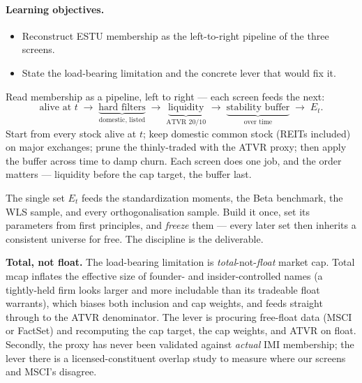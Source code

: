 \documentclass[11pt]{article}
\theoremstyle{definition}
\theoremstyle{plain}
\theoremstyle{remark}
\begin{document}
\paragraph{Learning objectives.}
\begin{itemize}[nosep,leftmargin=1.4em]
  \item Reconstruct ESTU membership as the left-to-right pipeline of the three screens.
  \item State the load-bearing limitation and the concrete lever that would fix it.
\end{itemize}

\begin{intuition}
Read membership as a pipeline, left to right --- each screen feeds the next:
\[
\text{alive at }t \;\to\; \underbrace{\text{hard filters}}_{\text{domestic, listed}} \;\to\; \underbrace{\text{liquidity}}_{\text{ATVR }20/10} \;\to\; \underbrace{\text{stability buffer}}_{\text{over time}} \;\to\; E_t.
\]
Start from every stock alive at $t$; keep domestic common stock (REITs included) on major exchanges; prune the thinly-traded with the ATVR proxy; then apply the buffer across time to damp churn. Each screen does one job, and the order matters --- liquidity before the cap target, the buffer last.
\end{intuition}

\begin{keyresult}
The single set $E_t$ feeds the standardization moments, the Beta benchmark, the WLS sample, and every orthogonalisation sample. Build it once, set its parameters from first principles, and \emph{freeze} them --- every later set then inherits a consistent universe for free. The discipline is the deliverable.
\end{keyresult}

\begin{pitfall}
\textbf{Total, not float.} The load-bearing limitation is \emph{total}-not-\emph{float} market cap. Total mcap inflates the effective size of founder- and insider-controlled names (a tightly-held firm looks larger and more includable than its tradeable float warrants), which biases both inclusion and cap weights, and feeds straight through to the ATVR denominator. The lever is procuring free-float data (MSCI or FactSet) and recomputing the cap target, the cap weights, and ATVR on float. Secondly, the proxy has never been validated against \emph{actual} IMI membership; the lever there is a licensed-constituent overlap study to measure where our screens and MSCI's disagree.
\end{pitfall}
\end{document}
